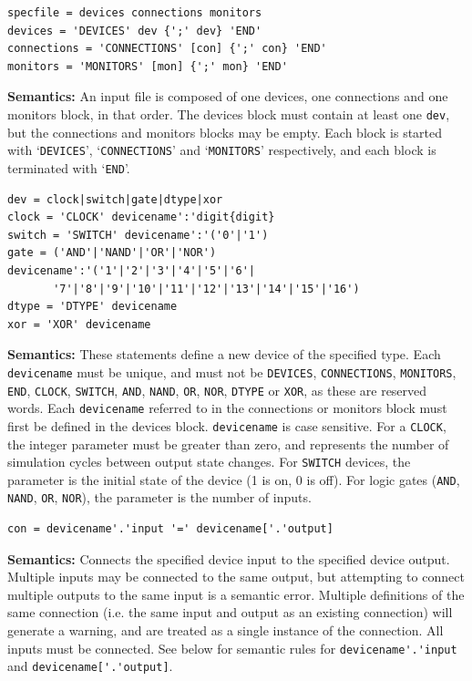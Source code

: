 \documentclass[a4paper,10pt]{article}
\begin{document}
\begin{verbatim}
specfile = devices connections monitors
devices = 'DEVICES' dev {';' dev} 'END'
connections = 'CONNECTIONS' [con] {';' con} 'END' 
monitors = 'MONITORS' [mon] {';' mon} 'END'
\end{verbatim} 

\textbf{Semantics:} An input file is composed of one devices, one connections and one monitors block, in that order. The devices block must contain at least one \texttt{dev}, but the connections and monitors blocks may be empty. Each block is started with `\texttt{DEVICES}', `\texttt{CONNECTIONS}' and `\texttt{MONITORS}' respectively, and each block is terminated with `\texttt{END}'.

\begin{verbatim}
dev = clock|switch|gate|dtype|xor
clock = 'CLOCK' devicename':'digit{digit}
switch = 'SWITCH' devicename':'('0'|'1')
gate = ('AND'|'NAND'|'OR'|'NOR') devicename':'('1'|'2'|'3'|'4'|'5'|'6'|
       '7'|'8'|'9'|'10'|'11'|'12'|'13'|'14'|'15'|'16')
dtype = 'DTYPE' devicename
xor = 'XOR' devicename
\end{verbatim} 

\textbf{Semantics:} These statements define a new device of the specified type. Each \texttt{devicename} must be unique, and must not be \texttt{DEVICES}, \texttt{CONNECTIONS}, \texttt{MONITORS}, \texttt{END}, \texttt{CLOCK}, \texttt{SWITCH}, \texttt{AND}, \texttt{NAND}, \texttt{OR}, \texttt{NOR}, \texttt{DTYPE} or \texttt{XOR}, as these are reserved words.
Each \texttt{devicename} referred to in the connections or monitors block must first be defined in the devices block. \texttt{devicename} is case sensitive. For a \texttt{CLOCK}, the integer parameter must be greater than zero, and represents the number of simulation cycles between output state changes. For \texttt{SWITCH} devices, the parameter is the initial state of the device (1 is on, 0 is off).
For logic gates (\texttt{AND}, \texttt{NAND}, \texttt{OR}, \texttt{NOR}), the parameter is the number of inputs.

\begin{verbatim}
con = devicename'.'input '=' devicename['.'output]
\end{verbatim} 
\textbf{Semantics:} Connects the specified device input to the specified device output. Multiple inputs may be connected to the same output, but attempting to connect multiple outputs to the same input is a semantic error. Multiple definitions of the same connection (i.e. the same input and output as an existing connection) will generate a warning, and are treated as a single instance of the connection. All inputs must be connected. See below for semantic rules for \verb|devicename'.'input| and \verb|devicename['.'output]|.
\end{document}

